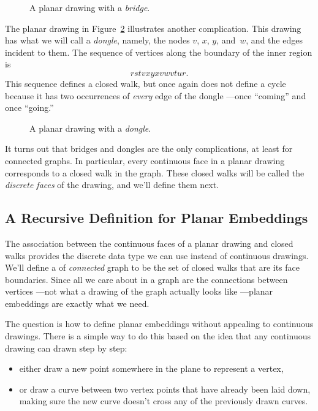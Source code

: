 \begin{figure}


\caption{A planar drawing with a \emph{bridge}.}
\label{fig:bridge}
\end{figure}

The planar drawing in Figure~\ref{fig:dongle} illustrates another
complication.  This drawing has what we will call a \emph{dongle},
namely, the nodes $v$, $x$, $y$, and~$w$, and the edges incident to
them.  The sequence of vertices along the boundary
of the inner region is
\[
rstvxyxvwvtur.
\]
This sequence defines a closed walk, but once again does not define a
cycle because it has two occurrences of \emph{every} edge of the
dongle ---once ``coming'' and once ``going.''

\begin{figure}


\caption{A planar drawing with a \emph{dongle}.}
\label{fig:dongle}
\end{figure}

It turns out that bridges and dongles are the only complications, at
least for connected graphs.  In particular, every continuous face in a
planar drawing corresponds to a closed walk in the graph.  These
closed walks will be called the \emph{discrete faces} of the drawing,
and we'll define them next.

\subsection{A Recursive Definition for Planar Embeddings}

The association between the continuous faces of a planar drawing and
closed walks provides the discrete data type we can use instead of
continuous drawings.  We'll define a  of
\emph{connected} graph to be the set of closed walks that are its face
boundaries.  Since all we care about in a graph are the connections
between vertices ---not what a drawing of the graph actually looks
like ---planar embeddings are exactly what we need.

The question is how to define planar embeddings without appealing to
continuous drawings.  There is a simple way to do this based on the
idea that any continuous drawing can drawn step by step: 
\begin{itemize}
\item either draw a new point somewhere in the plane to represent a vertex,

\item or draw a curve between two vertex points that have already been
  laid down, making sure the new curve doesn't cross any of the
  previously drawn curves.
\end{itemize}

